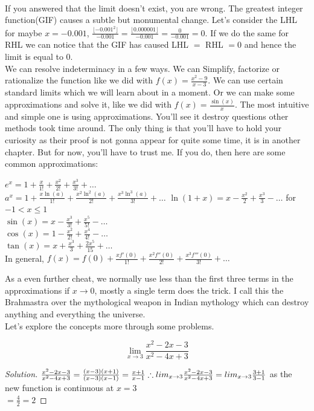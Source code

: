 \\
If you answered that the limit doesn't exist, you are wrong. The greatest integer function(GIF) causes a subtle but monumental change. Let's consider the LHL for maybe $x=-0.001$, $\frac{\lfloor {-0.001}^2 \rfloor}{-0.001}=\frac{\lfloor 0.000001 \rfloor}{-0.001}=\frac{0}{-0.001}=0$. If we do the same for RHL we can notice that the GIF has caused LHL $=$ RHL $=0$ and hence the limit is equal to $0$.\\
We can resolve indeterminacy in a few ways. We can Simplify, factorize or rationalize the function like we did with $f(x)=\frac{x^2-9}{x-3}$. We can use certain standard limits which we will learn about in a moment. Or we can make some approximations and solve it, like we did with $f(x)=\frac{\sin(x)}{x}$. The most intuitive and simple one is using approximations. You'll see it destroy questions other methods took time around. The only thing is that you'll have to hold your curiosity as their proof is not gonna appear for quite some time, it is in another chapter. But for now, you'll have to trust me. If you do, then here are some common approximations:\\
\begin{theorem}
    $e^x=1+\frac{x}{1!}+\frac{x^2}{2!}+\frac{x^3}{3!}+ \dots$ \\
    $a^x=1+\frac{x\ln(a)}{1!}+\frac{x^2\ln^2(a)}{2!}+\frac{x^3\ln^3(a)}{3!}+\dots$
    $\ln(1+x)=x-\frac{x^2}{2}+\frac{x^3}{3}-\dots$ for $-1 < x \leq 1$\\
    $\sin(x)=x-\frac{x^3}{3!}+\frac{x^5}{5!}-\dots$\\
    $\cos(x)=1-\frac{x^2}{2!}+\frac{x^4}{4!}-\dots$\\
    $\tan(x)=x+\frac{x^3}{3}+\frac{2x^5}{15}+\dots$\\
    In general, $f(x)=f(0)+\frac{xf'(0)}{1!}+\frac{x^2f''(0)}{2!}+\frac{x^3f'''(0)}{3!}+\dots$
\end{theorem}
As a even further cheat, we normally use less than the first three terms in the approximations if $x \to 0$, mostly a single term does the trick. I call this the Brahmastra over the mythological weapon in Indian mythology which can destroy anything and everything the universe.\\
Let's explore the concepts more through some problems.\\
\begin{example}
    \[\lim_{x \to 3} \frac{x^2-2x-3}{x^2-4x+3}\]
\end{example}
\begin{proof}
    [Solution]
    $\frac{x^2-2x-3}{x^2-4x+3}\\
    = \frac{(x-3)(x+1)}{(x-3)(x-1)}\\
    =\frac{x+1}{x-1}\\
    \therefore lim_{x \to 3} \frac{x^2-2x-3}{x^2-4x+3}
    = lim_{x \to 3} \frac{3+1}{3-1}$ as the new function is continuous at $x=3$\\
    $= \frac{4}{2}=2$
\end{proof}
